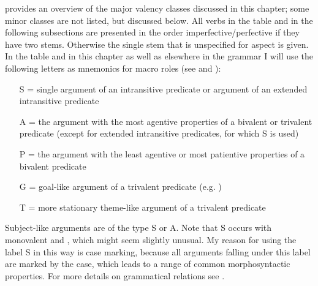  provides an overview of the major valency classes discussed in this chapter; some minor classes are not listed, but discussed below. All verbs in the table and in the following subsections are presented in the order imperfective\slash perfective if they have two stems. Otherwise the single stem that is unspecified for aspect is given. In the table and in this chapter as well as elsewhere in the grammar I will use the following letters as mnemonics for macro roles (see \citealt{Bickel2011} and \citealt{Bickel.etal2015}): 

\begin{itemize}
	\item[S =] single argument of an intransitive predicate or  argument of an extended intransitive predicate
	\item[A =] the argument with the most agentive properties of a bivalent or trivalent predicate (except for extended intransitive predicates, for which S is used)
	\item[P =] the argument with the least agentive or most patientive properties of a bivalent predicate
	\item[G =] goal-like argument of a trivalent predicate (e.g. )
	\item[T =] more stationary theme-like argument of a trivalent predicate 
	\end{itemize}
Subject-like arguments are of the type S or A. Note that S occurs with monovalent and , which might seem slightly unusual. My reason for using the label S in this way is case marking, because all arguments falling under this label are marked by the  case, which leads to a range of common morphosyntactic properties. For more details on grammatical relations see .


